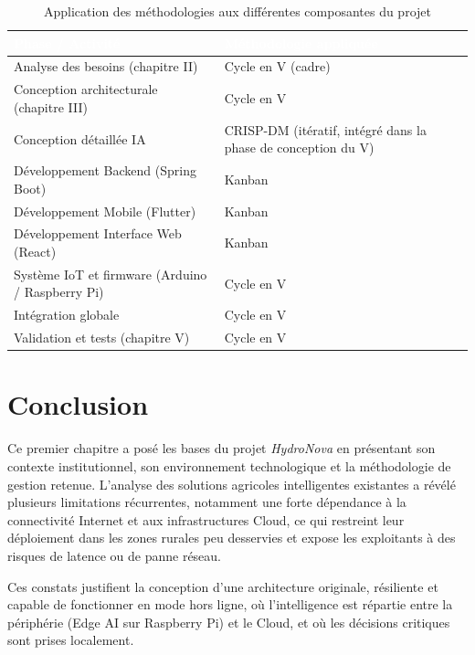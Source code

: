 \begin{table}[!htbp]
	\centering
	\small
	\renewcommand{\arraystretch}{1.5}
	\begin{tabularx}{\textwidth}{|p{6.5cm}|X|}
		\hline
		\rowcolor[HTML]{2C3E50}
		\textcolor{white}{\textbf{Phase / Activité}} & \textcolor{white}{\textbf{Méthodologie appliquée}} \\ \hline
		\rowcolor[HTML]{EFEFEF}
		Analyse des besoins (chapitre II) & Cycle en V (cadre) \\ \hline
		Conception architecturale (chapitre III) & Cycle en V \\ \hline
		\rowcolor[HTML]{EFEFEF}
		Conception détaillée IA & CRISP-DM (itératif, intégré dans la phase de conception du V) \\ \hline
		Développement Backend (Spring Boot) & Kanban \\ \hline
		\rowcolor[HTML]{EFEFEF}
		Développement Mobile (Flutter) & Kanban \\ \hline
		Développement Interface Web (React) & Kanban \\ \hline
		\rowcolor[HTML]{EFEFEF}
		Système IoT et firmware (Arduino / Raspberry Pi) & Cycle en V  \\ \hline
		Intégration globale & Cycle en V \\ \hline
		\rowcolor[HTML]{EFEFEF}
		Validation et tests (chapitre V) & Cycle en V \\ \hline
	\end{tabularx}
	\caption{Application des méthodologies aux différentes composantes du projet}
	\label{tab:methodologies_composantes}
\end{table}

	
	\section*{Conclusion}

Ce premier chapitre a posé les bases du projet \textit{HydroNova} en présentant son contexte institutionnel, son environnement technologique et la méthodologie de gestion retenue. L’analyse des solutions agricoles intelligentes existantes a révélé plusieurs limitations récurrentes, notamment une forte dépendance à la connectivité Internet et aux infrastructures Cloud, ce qui restreint leur déploiement dans les zones rurales peu desservies et expose les exploitants à des risques de latence ou de panne réseau.

Ces constats justifient la conception d’une architecture originale, résiliente et capable de fonctionner en mode hors ligne, où l’intelligence est répartie entre la périphérie (Edge AI sur Raspberry Pi) et le Cloud, et où les décisions critiques sont prises localement.

